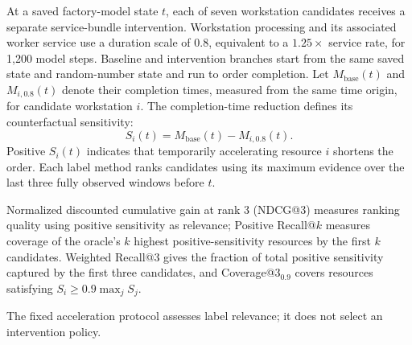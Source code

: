 \documentclass[a4paper,fleqn]{cas-dc}
\begin{document}
At a saved factory-model state $t$, each of seven workstation candidates receives a separate service-bundle intervention. Workstation processing and its associated worker service use a duration scale of $0.8$, equivalent to a $1.25\times$ service rate, for 1,200 model steps. Baseline and intervention branches start from the same saved state and random-number state and run to order completion. Let $M_{\mathrm{base}}(t)$ and $M_{i,0.8}(t)$ denote their completion times, measured from the same time origin, for candidate workstation $i$. The completion-time reduction defines its counterfactual sensitivity:
\begin{equation}
S_i(t)=M_{\mathrm{base}}(t)-M_{i,0.8}(t).
\end{equation}
Positive $S_i(t)$ indicates that temporarily accelerating resource $i$ shortens the order. Each label method ranks candidates using its maximum evidence over the last three fully observed windows before $t$.

Normalized discounted cumulative gain at rank 3 (NDCG@3) measures ranking quality using positive sensitivity as relevance; Positive Recall@$k$ measures coverage of the oracle's $k$ highest positive-sensitivity resources by the first $k$ candidates. Weighted Recall@3 gives the fraction of total positive sensitivity captured by the first three candidates, and Coverage@3$_{0.9}$ covers resources satisfying $S_i\geq0.9\max_j S_j$.

The fixed acceleration protocol assesses label relevance; it does not select an intervention policy.

\FloatBarrier
\setcounter{topnumber}{4}
\setcounter{bottomnumber}{3}
\setcounter{totalnumber}{7}
\setcounter{dbltopnumber}{4}
\renewcommand{\topfraction}{0.9}
\renewcommand{\bottomfraction}{0.85}
\renewcommand{\textfraction}{0.08}
\renewcommand{\floatpagefraction}{0.7}
\renewcommand{\dbltopfraction}{0.9}
\renewcommand{\dblfloatpagefraction}{0.85}
\setlength{\floatsep}{10pt plus 2pt minus 2pt}
\setlength{\textfloatsep}{12pt plus 2pt minus 3pt}
\setlength{\dblfloatsep}{10pt plus 2pt minus 2pt}
\setlength{\dbltextfloatsep}{12pt plus 2pt minus 3pt}
\makeatletter
\def\@dbflt#1{\@ifnextchar[{\@xdblfloat{#1}}{%
  \edef\reserved@a{\noexpand\@xdblfloat{#1}[\csname fps@#1\endcsname]}%
  \reserved@a}}
\setlength{\@fpsep}{12pt plus 2pt minus 2pt}
\setlength{\@dblfpsep}{12pt plus 2pt minus 2pt}
\makeatother
\raggedbottom
\end{document}
